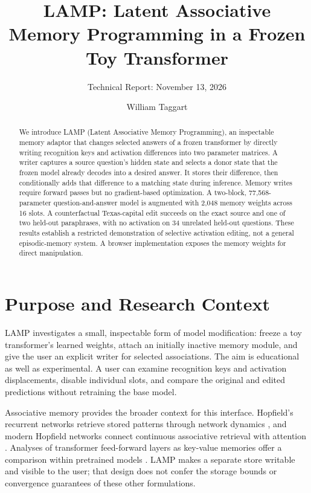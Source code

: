 \documentclass[manuscript,screen,nonacm]{acmart}
\begin{document}
\title{LAMP: Latent Associative Memory Programming in a Frozen Toy Transformer}
\author{William Taggart}
\subtitle{Technical Report: November 13, 2026}
\begin{abstract}
We introduce LAMP (Latent Associative Memory Programming), an inspectable memory adaptor that changes selected answers of a frozen transformer by directly writing recognition keys and activation differences into two parameter matrices. A writer captures a source question's hidden state and selects a donor state that the frozen model already decodes into a desired answer. It stores their difference, then conditionally adds that difference to a matching state during inference. Memory writes require forward passes but no gradient-based optimization. A two-block, 77,568-parameter question-and-answer model is augmented with 2,048 memory weights across 16 slots. A counterfactual Texas-capital edit succeeds on the exact source and one of two held-out paraphrases, with no activation on 34 unrelated held-out questions. These results establish a restricted demonstration of selective activation editing, not a general episodic-memory system. A browser implementation exposes the memory weights for direct manipulation.
\end{abstract}
\maketitle

\section{Purpose and Research Context}

LAMP investigates a small, inspectable form of model modification: freeze a toy transformer's learned weights, attach an initially inactive memory module, and give the user an explicit writer for selected associations. The aim is educational as well as experimental. A user can examine recognition keys and activation displacements, disable individual slots, and compare the original and edited predictions without retraining the base model.

Associative memory provides the broader context for this interface. Hopfield's recurrent networks retrieve stored patterns through network dynamics \cite{hopfield}, and modern Hopfield networks connect continuous associative retrieval with attention \cite{modernhopfield}. Analyses of transformer feed-forward layers as key-value memories offer a comparison within pretrained models \cite{kvffn}. LAMP makes a separate store writable and visible to the user; that design does not confer the storage bounds or convergence guarantees of these other formulations.
\end{document}
